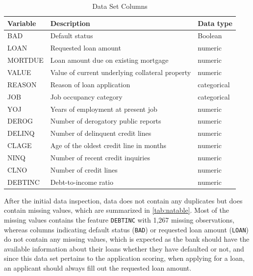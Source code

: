 \begin{table}[H]
\small
\setlength{\tabcolsep}{8pt}
\renewcommand{\arraystretch}{1.3}
\begin{center}
\caption[Data Set Columns]{Data Set Columns}\label{tab:dataset}
\begin{tabular}{@{} l p{8cm} l @{}}
\toprule
\textbf{Variable} & \textbf{Description} & \textbf{Data type}\\
\midrule
\hline
BAD & Default status & Boolean \\

LOAN & Requested loan amount & numeric \\

MORTDUE & Loan amount due on existing mortgage & numeric \\

VALUE & Value of current underlying collateral property & numeric \\

REASON & Reason of loan application & categorical \\
JOB & Job occupancy category & categorical \\

YOJ & Years of employment at present job & numeric \\

DEROG & Number of derogatory public reports & numeric \\

DELINQ & Number of delinquent credit lines & numeric \\

CLAGE & Age of the oldest credit line in months & numeric \\

NINQ & Number of recent credit inquiries & numeric \\

CLNO & Number of credit lines & numeric \\

DEBTINC & Debt-to-income ratio & numeric \\
\hline
\bottomrule
\end{tabular}
\end{center}
\begin{center} %
\end{center}
\end{table}

After the initial data inspection, data does not contain any duplicates but does contain missing values, which are summarized in \autoref{tab:natable}.
Most of the missing values contains the feature \texttt{DEBTINC} with 1,267 missing observations, whereas columns indicating default status (\texttt{BAD}) or requested loan amount (\texttt{LOAN}) do not contain any missing values, which is expected as the bank should have the available information about their loans whether they have defaulted or not, and since this data set pertains to the application scoring, when applying for a loan, an applicant should always fill out the requested loan amount.

